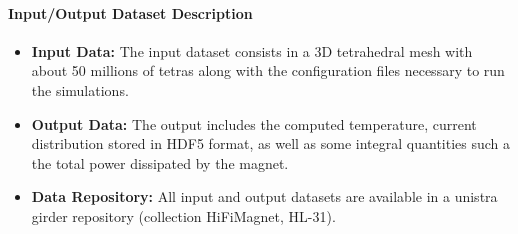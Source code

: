 \paragraph{Input/Output Dataset Description}

\begin{itemize}
    \item \textbf{Input Data:} The input dataset consists in a 3D tetrahedral mesh with about 50 millions of tetras along with the  configuration files necessary to run the simulations.
    \item \textbf{Output Data:} The output includes the computed temperature, current distribution stored in HDF5 format, as well as some integral quantities such a the total power dissipated by the magnet.
    \item \textbf{Data Repository:} All input and output datasets are available in a unistra girder repository (collection HiFiMagnet, HL-31).
\end{itemize}


